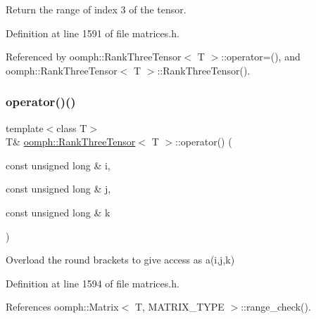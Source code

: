 Return the range of index 3 of the tensor. 



Definition at line 1591 of file matrices.\+h.



Referenced by oomph\+::\+Rank\+Three\+Tensor$<$ T $>$\+::operator=(), and oomph\+::\+Rank\+Three\+Tensor$<$ T $>$\+::\+Rank\+Three\+Tensor().

\mbox{\label{classoomph_1_1RankThreeTensor_ae5180883710cddbc2de5929df147bed5}} 
\subsubsection{\texorpdfstring{operator()()}{operator()()}\hspace{0.1cm}{\footnotesize\ttfamily [1/2]}}
{\footnotesize\ttfamily template$<$class T$>$ \\
T\& \hyperlink{classoomph_1_1RankThreeTensor}{oomph\+::\+Rank\+Three\+Tensor}$<$ T $>$\+::operator() (\begin{DoxyParamCaption}\item[{const unsigned long \&}]{i,  }\item[{const unsigned long \&}]{j,  }\item[{const unsigned long \&}]{k }\end{DoxyParamCaption})\hspace{0.3cm}{\ttfamily [inline]}}



Overload the round brackets to give access as a(i,j,k) 



Definition at line 1594 of file matrices.\+h.



References oomph\+::\+Matrix$<$ T, M\+A\+T\+R\+I\+X\+\_\+\+T\+Y\+P\+E $>$\+::range\+\_\+check().

\mbox{\label{classoomph_1_1RankThreeTensor_aa97b7b4cb4b619c24ef9abebcd0d892c}} 
